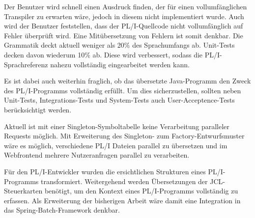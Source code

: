 Der Benutzer wird schnell einen Ausdruck finden, der für einen vollumfänglichen Transpiler zu erwarten wäre, jedoch in diesem nicht implementiert wurde.
Auch wird der Benutzer feststellen, dass der PL/I-Quellcode nicht vollumfänglich auf Fehler überprüft wird. Eine Mitübersetzung von Fehlern ist somit denkbar.
Die Grammatik deckt aktuell weniger als 20\% des Sprachumfangs ab. Unit-Tests decken davon wiederum 10\% ab.
Diese wird verbessert, sodass die PL/I-Sprachreferenz nahezu vollständig eingearbeitet werden kann.

Es ist dabei auch weiterhin fraglich, ob das übersetzte Java-Programm den Zweck des PL/I-Programms vollständig erfüllt. 
Um dies sicherzustellen, sollten neben Unit-Tests, Integrations-Tests und System-Tests auch User-Acceptence-Tests berücksichtigt werden.

Aktuell ist mit einer Singleton-Symboltabelle keine Verarbeitung paralleler Requests möglich. Mit Erweiterung des Singleton- zum Factory-Entwurfsmuster wäre es möglich, verschiedene PL/I Dateien parallel zu übersetzen und im Webfrontend mehrere Nutzeranfragen parallel zu verarbeiten. 

Für den PL/I-Entwickler wurden die ersichtlichen Strukturen eines PL/I-Programms transformiert. Weitergehend werden Übersetzungen der JCL-Steuerkarten benötigt, 
um den Kontext eines PL/I-Programms vollständig zu erfassen. Als Erweiterung der bisherigen Arbeit wäre damit eine Integration in das Spring-Batch-Framework denkbar.






